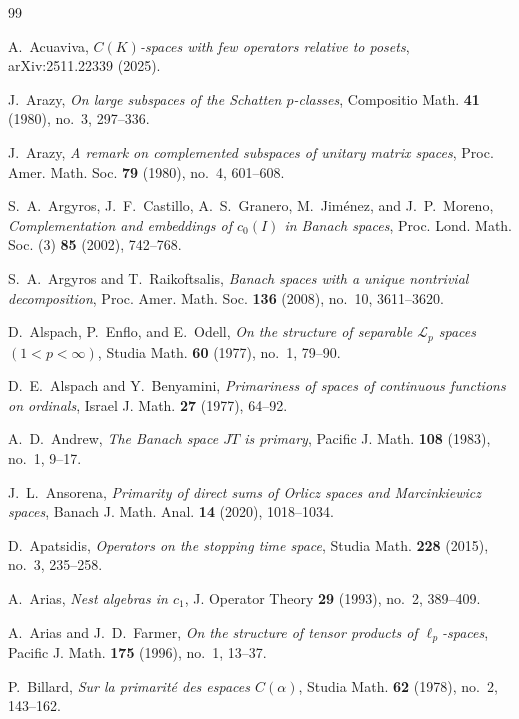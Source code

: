 \documentclass[11pt]{amsart}
\theoremstyle{plain}
\theoremstyle{definition}
\numberwithin{equation}{section}
\begin{document}
\begin{thebibliography}{99}

A.~Acuaviva, \emph{$C(K)$-spaces with few operators relative to posets},
arXiv:2511.22339 (2025).


J.~Arazy,
\emph{On large subspaces of the Schatten $p$-classes},
Compositio Math. \textbf{41} (1980), no.~3, 297--336.

J.~Arazy,
\emph{A remark on complemented subspaces of unitary matrix spaces},
Proc. Amer. Math. Soc. \textbf{79} (1980), no.~4, 601--608.

S.~A.~Argyros, J.~F.~Castillo, A.~S.~Granero, M.~Jim\'enez, and J.~P.~Moreno,
\emph{Complementation and embeddings of $c_0(I)$ in Banach spaces},
Proc. Lond. Math. Soc. (3) \textbf{85} (2002), 742--768.

S.~A.~Argyros and T.~Raikoftsalis,
\emph{Banach spaces with a unique nontrivial decomposition},
Proc. Amer. Math. Soc. \textbf{136} (2008), no.~10, 3611--3620.

D.~Alspach, P.~Enflo, and E.~Odell,
\emph{On the structure of separable $\mathscr{L}_p$ spaces $(1<p<\infty)$},
Studia Math. \textbf{60} (1977), no.~1, 79--90.

D.~E.~Alspach and Y.~Benyamini,
\emph{Primariness of spaces of continuous functions on ordinals},
Israel J. Math. \textbf{27} (1977), 64--92.

A.~D.~Andrew,
\emph{The Banach space $JT$ is primary},
Pacific J. Math. \textbf{108} (1983), no.~1, 9--17.


J.~L.~Ansorena,
\emph{Primarity of direct sums of Orlicz spaces and Marcinkiewicz spaces},
Banach J. Math. Anal. \textbf{14} (2020), 1018--1034.

D.~Apatsidis,
\emph{Operators on the stopping time space},
Studia Math. \textbf{228} (2015), no.~3, 235--258.


A.~Arias,
\emph{Nest algebras in $c_1$},
J. Operator Theory \textbf{29} (1993), no.~2, 389--409.

A.~Arias and J.~D.~Farmer,
\emph{On the structure of tensor products of $\ell_p$-spaces},
Pacific J. Math. \textbf{175} (1996), no.~1, 13--37.

P.~Billard,
\emph{Sur la primarit\'e des espaces $C(\alpha)$},
Studia Math. \textbf{62} (1978), no.~2, 143--162.


\end{thebibliography}
\end{document}
